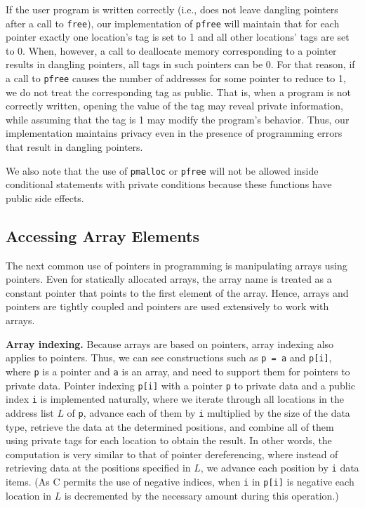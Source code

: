 \documentclass[11pt]{article}
\begin{document}
If the user program is written correctly (i.e., does not leave dangling
pointers after a call to \texttt{free}), our implementation of
\texttt{pfree} will maintain that for each pointer exactly one location's
tag is set to 1 and all other locations' tags are set to 0. When, however, a
call to deallocate memory corresponding to a pointer results in dangling
pointers, all tags in such pointers can be 0. For that reason, if a call to
\texttt{pfree} causes the number of addresses for some pointer to reduce
to 1, we do not treat the corresponding tag as public. That is, when a
program is not correctly written, opening the value of the tag may reveal
private information, while assuming that the tag is 1 may modify the program's
behavior. Thus, our implementation maintains privacy even in the presence of
programming errors that result in dangling pointers.

We also note that the use of \texttt{pmalloc} or \texttt{pfree} will not be
allowed inside conditional statements with private conditions because these
functions have public side effects.

\subsection{Accessing Array Elements}

The next common use of pointers in programming is manipulating arrays using
pointers. Even for statically allocated arrays, the array name is treated as
a constant pointer that points to the first element of the array. Hence,
arrays and pointers are tightly coupled and pointers are used extensively to
work with arrays.

\medskip \noindent \textbf{Array indexing.} Because arrays are based on
pointers, array indexing also applies to pointers. Thus, we can see
constructions such as \texttt{p = a} and \texttt{p[i]}, where \texttt{p} is
a pointer and \texttt{a} is an array, and need to support them for pointers
to private data. Pointer indexing \texttt{p[i]} with a pointer \texttt{p} to
private data and a public index \texttt{i} is implemented naturally, where
we iterate through all locations in the address list $L$ of \texttt{p},
advance each of them by \texttt{i} multiplied by the size of the data type,
retrieve the data at the determined positions, and combine all of them using
private tags for each location to obtain the result. In other words, the
computation is very similar to that of pointer dereferencing, where instead
of retrieving data at the positions specified in $L$, we advance each
position by \texttt{i} data items. (As C permits the use of negative
indices, when \texttt{i} in \texttt{p[i]} is negative each location in $L$
is decremented by the necessary amount during this operation.)
\end{document}

